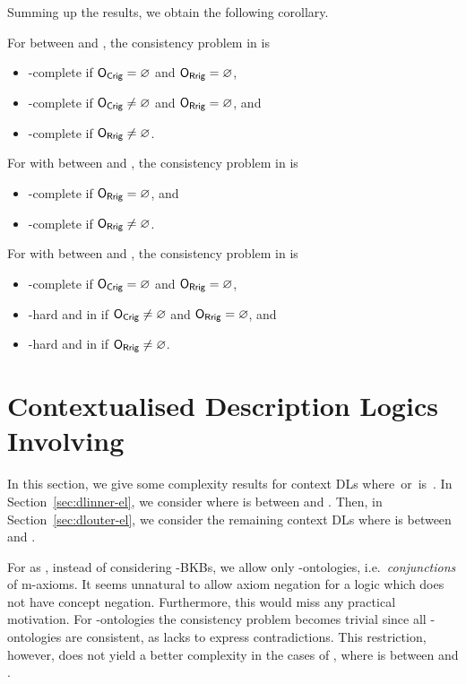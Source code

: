 Summing up the results, we obtain the following corollary.

\begin{corollary}
  For \LMLO between \ELALC and \SHOQSHOQ, the consistency problem in \LMLO is
  \begin{itemize}
  \item \ExpTime-complete if  $\mathsf{O_{Crig}}=\varnothing$ and $\mathsf{O_{Rrig}}=\varnothing$,
  \item \NExpTime-complete if $\mathsf{O_{Crig}}\ne\varnothing$ and $\mathsf{O_{Rrig}}=\varnothing$, and
  \item \TwoExpTime-complete if $\mathsf{O_{Rrig}}\ne\varnothing$.
  \end{itemize}
  For \SHOIQLO with \LO between \ALC and \SHOQ, the consistency problem in \SHOIQLO is
  \begin{itemize}
  \item \NExpTime-complete if $\mathsf{O_{Rrig}}=\varnothing$, and
  \item \TwoExpTime-complete if $\mathsf{O_{Rrig}}\neq\varnothing$.
  \end{itemize}
  For \LMSHOIQ with \LM between \EL and \SHOIQ, the consistency problem in \LMSHOIQ is
  \begin{itemize}
  \item \NExpTime-complete if  $\mathsf{O_{Crig}}=\varnothing$ and $\mathsf{O_{Rrig}}=\varnothing$,
  \item \NExpTime-hard and in \TwoNExpTime if $\mathsf{O_{Crig}}\ne\varnothing$ and $\mathsf{O_{Rrig}}=\varnothing$, and
  \item \TwoExpTime-hard and in \TwoNExpTime if $\mathsf{O_{Rrig}}\ne\varnothing$.
  \end{itemize}
\end{corollary}

\section{Contextualised Description Logics Involving \texorpdfstring{\EL}{EL}}
\label{sec:case-el} 

In this section, we give some complexity results for context DLs
\LMLO where~\LM or~\LO is~\EL.
%
In Section~\ref{sec:dlinner-el}, we consider \LMEL where \LM is between \ALC and \SHOIQ.  Then, in
Section~\ref{sec:dlouter-el}, we consider the remaining context DLs \ELLO where \LO is between \ALC
and \SHOIQ.

For \EL as \LM, instead of considering \ELLO-BKBs, we allow only \ELLO-ontologies, i.e.\
\emph{conjunctions} of m-axioms. It seems unnatural to allow axiom negation for a logic which does
not have concept negation. Furthermore, this would miss any practical motivation. For
\ELEL-ontologies the consistency problem becomes trivial since all \ELEL-ontologies are consistent,
as \EL lacks to express contradictions.
%
This restriction, however, does not yield a better complexity in the cases of \ELLO, where \LO is
between \ALC and \SHOQ.

